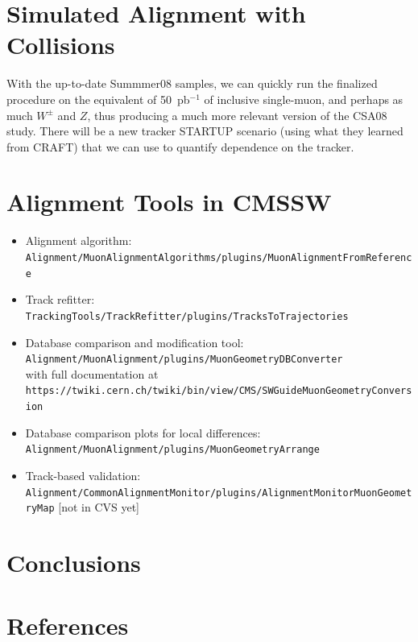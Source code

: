 \documentclass[12pt]{article}
\begin{document}
\section{Simulated Alignment with Collisions}

With the up-to-date Summmer08 samples, we can quickly run the
finalized procedure on the equivalent of 50~pb$^{-1}$ of inclusive
single-muon, and perhaps as much $W^\pm$ and $Z$, thus producing a
much more relevant version of the CSA08 study.  There will be a new
tracker STARTUP scenario (using what they learned from CRAFT) that we
can use to quantify dependence on the tracker.

\section{Alignment Tools in CMSSW}

\begin{itemize}
\item Alignment algorithm: \\ {\tt Alignment/MuonAlignmentAlgorithms/plugins/MuonAlignmentFromReference}
\item Track refitter: \\ {\tt TrackingTools/TrackRefitter/plugins/TracksToTrajectories}
\item Database comparison and modification tool: \\ {\tt Alignment/MuonAlignment/plugins/MuonGeometryDBConverter} \\ with full documentation at \\ {\tt https://twiki.cern.ch/twiki/bin/view/CMS/SWGuideMuonGeometryConversion}
\item Database comparison plots for local differences: \\ {\tt Alignment/MuonAlignment/plugins/MuonGeometryArrange}
\item Track-based validation: \\ {\tt Alignment/CommonAlignmentMonitor/plugins/AlignmentMonitorMuonGeometryMap} [not in CVS yet]
\end{itemize}

\section{Conclusions}

\section{References}
\end{document}
